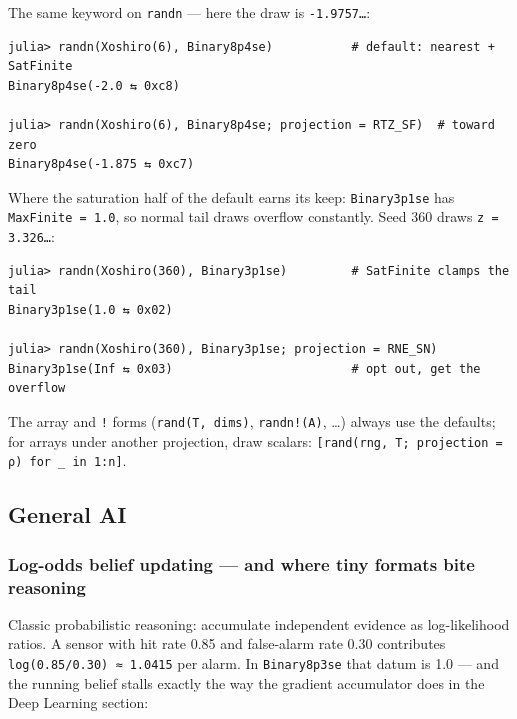 The same keyword on \texttt{randn} — here the draw is \texttt{-1.9757…}:




\nopagebreak[4]
\begin{verbatim}
julia> randn(Xoshiro(6), Binary8p4se)           # default: nearest + SatFinite
Binary8p4se(-2.0 ⇆ 0xc8)

julia> randn(Xoshiro(6), Binary8p4se; projection = RTZ_SF)  # toward zero
Binary8p4se(-1.875 ⇆ 0xc7)
\end{verbatim}



Where the saturation half of the default earns its keep: \texttt{Binary3p1se} has \texttt{MaxFinite = 1.0}, so normal tail draws overflow constantly. Seed 360 draws \texttt{z = 3.326…}:




\nopagebreak[4]
\begin{verbatim}
julia> randn(Xoshiro(360), Binary3p1se)         # SatFinite clamps the tail
Binary3p1se(1.0 ⇆ 0x02)

julia> randn(Xoshiro(360), Binary3p1se; projection = RNE_SN)
Binary3p1se(Inf ⇆ 0x03)                         # opt out, get the overflow
\end{verbatim}



The array and \texttt{!} forms (\texttt{rand(T, dims)}, \texttt{randn!(A)}, …) always use the defaults; for arrays under another projection, draw scalars: \texttt{[rand(\allowbreak{}rng, T; projection = ρ) for \_\allowbreak{} in 1:n]}.



\subsection{General AI}



\label{12995498770613901834-dup1}{}


\subsubsection{Log-odds belief updating — and where tiny formats bite reasoning}



\label{12572314235496160742}{}


Classic probabilistic reasoning: accumulate independent evidence as log-likelihood ratios. A sensor with hit rate 0.85 and false-alarm rate 0.30 contributes \texttt{log(0.85/0.30) ≈ 1.0415} per alarm. In \texttt{Binary8p3se} that datum is 1.0 — and the running belief stalls exactly the way the gradient accumulator does in the Deep Learning section:




